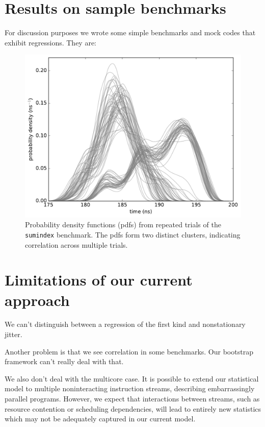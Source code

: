 \documentclass[conference]{IEEEtran}
\begin{document}
\section{Results on sample benchmarks}

For discussion purposes we wrote some simple benchmarks and mock codes that exhibit regressions. They are:




\begin{figure}[!t]
\centering
\includegraphics[width=\columnwidth]{figures/fig4/kde_pdf_sumindex}
\caption{Probability density functions (pdfs) from repeated trials of the
\lstinline|sumindex| benchmark. The pdfs form two distinct clusters, indicating
correlation across multiple trials.}
\label{fig:pdfsumindex}
\end{figure}


\section{Limitations of our current approach}

We can't distinguish between a regression of the first kind and nonstationary jitter.

Another problem is that we see correlation in some benchmarks. Our bootstrap framework can't really deal with that.

We also don't deal with the multicore case. It is possible to extend our statistical
model to multiple noninteracting instruction streams, describing embarrassingly
parallel programs. However, we expect that interactions between streams, such as
resource contention or scheduling dependencies, will lead to entirely new
statistics which may not be adequately captured in our current model.
\end{document}
